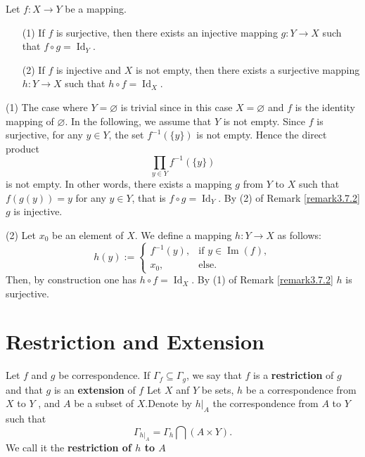 \begin{propositionenv}
\label{prop:direct-product-factorization}
Let $f : X \to Y$ be a mapping.
\begin{enumerate}
    \item[(1)] If $f$ is surjective,  then there exists an injective mapping $g : Y \to X$ such that $f \circ g = \operatorname{Id}_Y$.
    \item[(2)] If $f$ is injective and $X$ is not empty,  then there exists a surjective mapping $h : Y \to X$ such that $h \circ f = \operatorname{Id}_X$.
\end{enumerate}
\end{propositionenv}

\begin{proofenv}
(1) The case where $Y = \varnothing$ is trivial since in this case $X = \varnothing$ and $f$ is the identity mapping of $\varnothing$. In the following,  we assume that $Y$ is not empty. Since $f$ is surjective,  for any $y \in Y$,  the set $f^{-1}(\{y\})$ is not empty. Hence the direct product
\[
\prod_{y \in Y} f^{-1}(\{y\})
\]
is not empty. In other words,  there exists a mapping $g$ from $Y$ to $X$ such that $f(g(y)) = y$ for any $y \in Y$,  that is $f \circ g = \operatorname{Id}_Y$. By (2) of Remark \ref{remark3.7.2} $g$ is injective.

(2) Let $x_0$ be an element of $X$. We define a mapping $h : Y \to X$ as follows:
\[
h(y) := 
\begin{cases}
f^{-1}(y),  & \text{if } y \in \operatorname{Im}(f),  \\
x_0,  & \text{else}.
\end{cases}
\]
Then,  by construction one has $h \circ f = \operatorname{Id}_X$. 
\newline
By (1) of Remark \ref{remark3.7.2} $h$ is surjective.
\end{proofenv}
\section{Restriction and Extension}
\begin{definitionenv}
    Let $f$ and $g$ be correspondence. If $\Gamma _f\subseteq \Gamma _g$,  we say that $f$ is a \textbf{restriction} of $g$ and that $g$ is an \textbf{extension} of $f$
    \newline
    Let $X$ anf $Y$ be sets,  $h$ be a correspondence from $X$ to $Y$ , and $A$ be a subset of $X$.Denote by $h|_A$ the correspondence from $A$ to $Y$ such that$$\Gamma_{h|_A}=\Gamma_h\bigcap (A\times Y).$$ We call it the \textbf{restriction of $h$ to $A$}
\end{definitionenv}